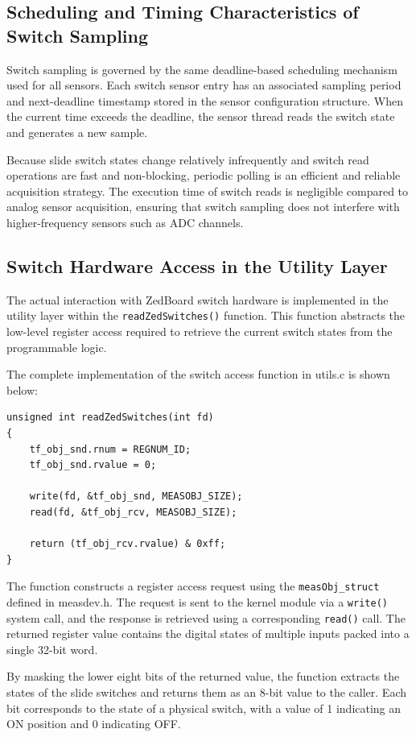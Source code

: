 \subsection{Scheduling and Timing Characteristics of Switch Sampling}
Switch sampling is governed by the same deadline-based scheduling mechanism used for all sensors. Each switch sensor entry has an associated sampling period and next-deadline timestamp stored in the sensor configuration structure. When the current time exceeds the deadline, the sensor thread reads the switch state and generates a new sample.

Because slide switch states change relatively infrequently and switch read operations are fast and non-blocking, periodic polling is an efficient and reliable acquisition strategy. The execution time of switch reads is negligible compared to analog sensor acquisition, ensuring that switch sampling does not interfere with higher-frequency sensors such as ADC channels.

\subsection{Switch Hardware Access in the Utility Layer}
The actual interaction with ZedBoard switch hardware is implemented in the utility layer within the \texttt{readZedSwitches()} function. This function abstracts the low-level register access required to retrieve the current switch states from the programmable logic.

The complete implementation of the switch access function in utils.c is shown below:
\begin{verbatim}
unsigned int readZedSwitches(int fd)
{
    tf_obj_snd.rnum = REGNUM_ID;
    tf_obj_snd.rvalue = 0;

    write(fd, &tf_obj_snd, MEASOBJ_SIZE);
    read(fd, &tf_obj_rcv, MEASOBJ_SIZE);

    return (tf_obj_rcv.rvalue) & 0xff;
}
\end{verbatim}

The function constructs a register access request using the \texttt{measObj\_struct }defined in measdev.h. The request is sent to the kernel module via a \texttt{write()} system call, and the response is retrieved using a corresponding \texttt{read()} call. The returned register value contains the digital states of multiple inputs packed into a single 32-bit word.

By masking the lower eight bits of the returned value, the function extracts the states of the slide switches and returns them as an 8-bit value to the caller. Each bit corresponds to the state of a physical switch, with a value of 1 indicating an ON position and 0 indicating OFF.

